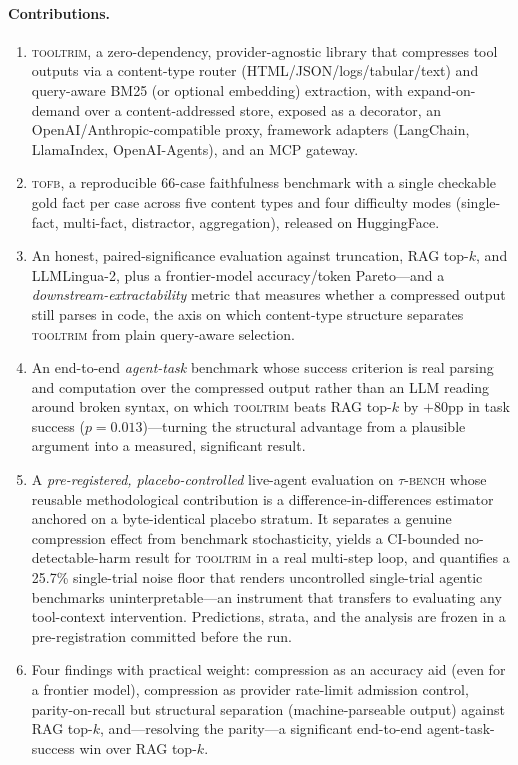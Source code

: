 \documentclass[11pt]{article}
\newcommand{\tooltrim}{\textsc{tooltrim}}
\newcommand{\tofb}{\textsc{tofb}}
\begin{document}
\paragraph{Contributions.}
\begin{enumerate}
\item \tooltrim, a zero-dependency, provider-agnostic library that compresses
tool outputs via a content-type router (HTML/JSON/logs/tabular/text) and
query-aware BM25 (or optional embedding) extraction, with expand-on-demand over
a content-addressed store, exposed as a decorator, an OpenAI/Anthropic-compatible
proxy, framework adapters (LangChain, LlamaIndex, OpenAI-Agents), and an MCP
gateway.
\item \tofb, a reproducible 66-case faithfulness benchmark with a single
checkable gold fact per case across five content types and four difficulty
modes (single-fact, multi-fact, distractor, aggregation), released on HuggingFace.
\item An honest, paired-significance evaluation against truncation, RAG top-$k$,
and LLMLingua-2, plus a frontier-model accuracy/token Pareto---and a
\emph{downstream-extractability} metric that measures whether a compressed output
still parses in code, the axis on which content-type structure separates
\tooltrim{} from plain query-aware selection.
\item An end-to-end \emph{agent-task} benchmark whose success criterion is real
parsing and computation over the compressed output rather than an LLM reading
around broken syntax, on which \tooltrim{} beats RAG top-$k$ by $+80$pp in task
success ($p{=}0.013$)---turning the structural advantage from a plausible
argument into a measured, significant result.
\item A \emph{pre-registered, placebo-controlled} live-agent evaluation on
\textsc{$\tau$-bench} whose reusable methodological contribution is a
difference-in-differences estimator anchored on a byte-identical placebo
stratum. It separates a genuine compression effect from benchmark stochasticity,
yields a CI-bounded no-detectable-harm result for \tooltrim{} in a real
multi-step loop, and quantifies a 25.7\% single-trial noise floor that renders
uncontrolled single-trial agentic benchmarks uninterpretable---an instrument that
transfers to evaluating any tool-context intervention. Predictions, strata, and
the analysis are frozen in a pre-registration committed before the run.
\item Four findings with practical weight: compression as an accuracy aid (even
for a frontier model), compression as provider rate-limit admission control,
parity-on-recall but structural separation (machine-parseable output) against RAG
top-$k$, and---resolving the parity---a significant end-to-end agent-task-success
win over RAG top-$k$.
\end{enumerate}
\end{document}
